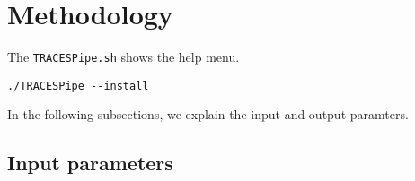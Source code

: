 \section{Methodology}
The \texttt{TRACESPipe.sh} shows the help menu.\\
\begin{lstlisting}
./TRACESPipe --install
\end{lstlisting}
In the following subsections, we explain the input and output paramters.

\subsection*{Input parameters}

